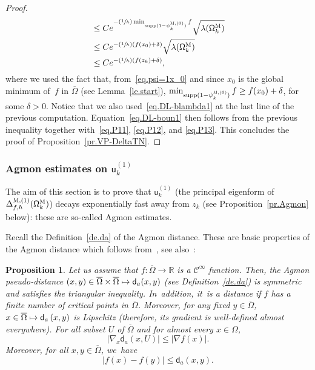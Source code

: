 \documentclass[10pt]{amsart}
\newcommand{\Psfrac}[2]{(\sfrac{#1}{#2})}
\newcommand\mto{\mathchoice{\longmapsto}{\mapsto}{\mapsto}{\mapsto}}
\theoremstyle{plain}
\newtheorem{proposition}{Proposition}
\theoremstyle{definition}
\begin{document}
\begin{proof}
\begin{align*}
&\le Ce^{-\Psfrac 1h \min_{\text{supp}(1- \psi^{\textsc{M},(0)}_k)} f} \sqrt{\lambda(\mathsf \Omega_k^{\textsc{M}}) }\\
&\le Ce^{-\Psfrac 1h (f(x_0)+\delta)} \sqrt{\lambda(\mathsf \Omega_k^{\textsc{M}}) }\\
&\le Ce^{-\Psfrac 1h (f(z_k)+\delta)},
\end{align*}
where we used the fact that, from~\eqref{eq.psi=1x_0} and since $x_0$ is the global minimum of~$f$ in $\overline \Omega$ (see Lemma~\ref{le.start}), $\min_{\text{supp}(1- \psi^{\textsc{M},(0)}_k)} f\ge f(x_0)+\delta$, for some $\delta>0$. Notice that we also used~\eqref{eq.DL-blambda1} at the last line of the previous computation.
Equation~\eqref{eq.DL-boun1} then follows from the previous inequality together with~\eqref{eq.P11}, \eqref{eq.P12}, and \eqref{eq.P13}.
This concludes the proof of Proposition~\ref{pr.VP-DeltaTN}.
\end{proof}

\subsubsection{Agmon estimates on $\mathsf u^{(1)}_k$}\label{sec.Agmon1}

The aim of this section is to prove that $\mathsf u^{(1)}_k$ (the
principal eigenform of $ \Delta_{f,h}^{\textsc{M},(1)} (\mathsf \Omega_k^{\textsc{M}}) $) decays
exponentially fast away from $z_k$ (see Proposition~\ref{pr.Agmon} below): these are so-called Agmon
estimates.

Recall the Definition~\ref{de.da} of the Agmon distance. These are basic properties of the Agmon distance which follows from~\cite[App.\,2]{helffer-sjostrand-85}, see also~\cite[Lem.\,3.2]{LeNi}:

\begin{proposition}
\label{pr.p-agmon}
Let us assume that $f:\overline \Omega\to \mathbb R$ is a $\mathcal C^\infty$ function. Then, the Agmon pseudo-distance $(x,y)\in \overline \Omega \times\overline \Omega \mto \mathsf d_a(x,y)$ (see Definition~\ref{de.da}) is symmetric and satisfies the triangular inequality. In~addition, it~is a distance if $f$ has a finite number of critical points in $\overline \Omega$.
Moreover, for any fixed $y \in \overline \Omega$, $x \in \overline \Omega\mto
\mathsf d_a\left(x,y\right)$ is Lipschitz (therefore, its gradient is well-defined almost everywhere). For all subset $U$ of $\overline \Omega$ and for almost every $x \in \Omega$,
\begin{equation} \label{eq.eqq}
\vert \nabla_x \mathsf d_a\left(x,U\right) \vert \leq \vert \nabla f (x) \vert.
\end{equation}
Moreover, for all $x,y \in \overline \Omega$, we~have
\begin{equation} \label{eq.ineq}
\vert f(x)-f(y)\vert \leq \mathsf d_a(x,y).
\end{equation}
\end{proposition}
\end{document}
